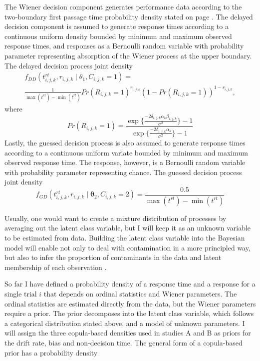 \documentclass[12pt]{article}
\begin{document}
{{{{{{{{{	The Wiener decision component generates performance data according to the two-boundary first passage time probability density stated on page \pageref{eq:wd}. The delayed decision component is assumed to generate response times according to a continuous uniform density bounded by minimum and maximum observed response times, and responses as a Bernoulli random variable with probability parameter representing absorption of the Wiener process at the upper boundary. The delayed decision process joint density
\begin{gather}
f_{DD}(t_{i,j,k}^{rt},r_{i,j,k} \mid \theta_1, C_{i,j,k} = 1) = \nonumber \\ 
\frac{1}{\operatorname{max}(t^{rt}) - \operatorname{min}(t^{rt})}Pr(R_{i,j,k}=1)^{r_{i,j,k}}(1-Pr(R_{i,j,k}=1))^{1-r_{i,j,k}},
\end{gather}
where
\begin{equation*}
Pr(R_{i,j,k}=1) = \frac{\operatorname{exp}                   \{\frac{-2\delta_{i,j,k} \alpha_k \beta_{i,j,k}}{\sigma^2}
\} - 1}{\operatorname{exp}\{
\frac{-2\delta_{i,j,k} \alpha_k}{\sigma^2}
\} - 1}
\end{equation*}
Lastly, the guessed decision process is also assumed to generate response times according to a continuous uniform variate bounded by minimum and maximum observed response time. The response, however, is a Bernoulli random variable with probability parameter representing chance. The guessed decision process joint density
\begin{equation}
f_{GD}(t_{i,j,k}^{rt},r_{i,j,k} \mid \boldsymbol{\theta}_2, C_{i,j,k} = 2) = \frac{0.5}{\operatorname{max}(t^{rt})-\operatorname{min}(t^{rt})}
\end{equation}

	Usually, one would want to create a mixture distribution of processes by averaging out the latent class variable, but I will keep it as an unknown variable to be estimated from data. Building the latent class variable into the Bayesian model will enable not only to deal with contamination in a more principled way, but also to infer the proportion of contaminants in the data and latent membership of each observation \citep{LeeFus2007,LeeWag2014}.
    
	So far I have defined a probability density of a response time and a response for a single trial $i$ that depends on ordinal statistics and Wiener parameters. The ordinal statistics are estimated directly from the data, but the Wiener parameters require a prior. The prior decomposes into the latent class variable, which follows a categorical distribution stated above, and a model of unknown parameters. I will assign the three copula-based densities used in studies A and B as priors for the drift rate, bias and non-decision time. The general form of a copula-based prior has a probability density 
    
}}}}}}}}}
\end{document}
